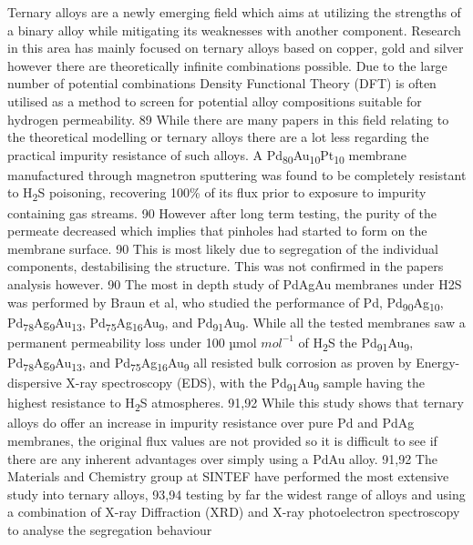 Ternary alloys are a newly emerging field which aims at utilizing the strengths of a binary 
alloy while mitigating its weaknesses with another component. Research in this area has 
mainly focused on ternary alloys based on copper, gold and silver however there are 
theoretically infinite combinations possible. Due to the large number of potential 
combinations Density Functional Theory (DFT) is often utilised as a method to screen for 
potential alloy compositions suitable for hydrogen permeability. 89 While there are many 
papers in this field relating to the theoretical modelling or ternary alloys there are a 
lot less regarding the practical impurity resistance of such alloys. A 
Pd\textsubscript{80}Au\textsubscript{10}Pt\textsubscript{10} membrane manufactured through 
magnetron sputtering was found to be completely resistant to H\textsubscript{2}S poisoning, 
recovering 100\% of its flux prior to exposure to impurity containing gas streams. 90 
However after long term testing, the purity of the permeate decreased which implies that 
pinholes had started to form on the membrane surface. 90 This is most likely due to 
segregation of the individual components, destabilising the structure. This was not 
confirmed in the papers analysis however. 90 The most in depth study of PdAgAu membranes 
under H2S was performed by Braun et al, who studied the performance of Pd, 
Pd\textsubscript{90}Ag\textsubscript{10}, Pd\textsubscript{78}Ag\textsubscript{9}Au\textsubscript{13}, 
Pd\textsubscript{75}Ag\textsubscript{16}Au\textsubscript{9}, and Pd\textsubscript{91}Au\textsubscript{9}. 
While all the tested membranes saw a permanent permeability loss under 100 µmol $mol^{-1}$ 
of H\textsubscript{2}S the Pd\textsubscript{91}Au\textsubscript{9}, Pd\textsubscript{78}Ag\textsubscript{9}Au\textsubscript{13}, 
and Pd\textsubscript{75}Ag\textsubscript{16}Au\textsubscript{9} all resisted bulk corrosion 
as proven by Energy-dispersive X-ray spectroscopy (EDS), with the Pd\textsubscript{91}Au\textsubscript{9} 
sample having the highest resistance to H\textsubscript{2}S atmospheres. 91,92 While this 
study shows that ternary alloys do offer an increase in impurity resistance over pure Pd and 
PdAg membranes, the original flux values are not provided so it is difficult to see if 
there are any inherent advantages over simply using a PdAu alloy. 91,92 The Materials 
and Chemistry group at SINTEF have performed the most extensive study into ternary 
alloys, 93,94 testing by far the widest range of alloys and using a combination  of X-ray 
Diffraction (XRD) and X-ray photoelectron spectroscopy to analyse the segregation behaviour 
